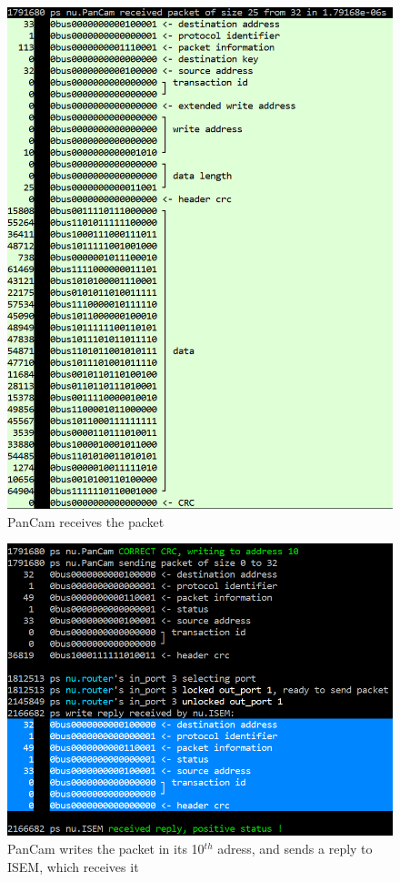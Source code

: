 \documentclass[12pt,a4paper]{article}
\begin{document}
\begin{figure}[hb]
	\centering
    \includegraphics[scale = 0.5]{results/PanCam_receives.png}
    \caption{PanCam receives the packet}
\end{figure}

\begin{figure}[hb]
	\centering
    \includegraphics[scale = 0.5]{results/reply_packet_sent.png}
    \caption{PanCam writes the packet in its 10$^{th}$ adress, and sends a reply to ISEM, which receives it}
\end{figure}
\end{document}
